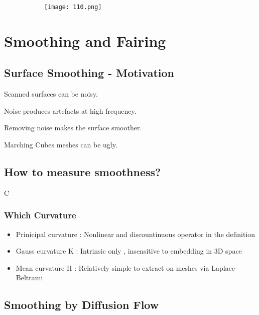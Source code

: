 \documentclass{article}
\begin{document}
    \begin{figure}[ht!]
  \centering
  \begin{subfigure}[b]{0.7\linewidth}
    \texttt{[image: 110.png]}
  \end{subfigure}
\end{figure}


\vspace{20mm}

\section{Smoothing and Fairing}

\subsection{Surface Smoothing - Motivation}

Scanned surfaces can be noisy.

Noise produces artefacts at high frequency.

Removing noise makes the surface smoother.

Marching Cubes meshes can be ugly.

\subsection{How to measure smoothness?}

 C

\subsubsection{Which Curvature}

\begin{itemize}
    \item Prinicipal curvature : Nonlinear and discountinuous operator in the definition
    \item Gauss curvature K : Intrinsic only , insensitive to embedding in 3D space
    \item Mean curvature H : Relatively simple to extract on meshes via Laplace-Beltrami
\end{itemize}

\vspace{35mm}

\subsection{Smoothing by Diffusion Flow}
\end{document}
